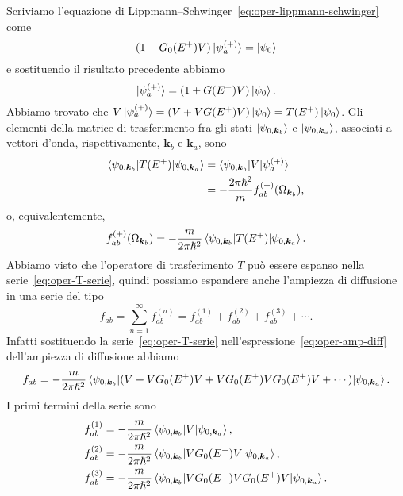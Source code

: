 \documentclass[a4paper,fleqn,twoside,12pt]{article}
\begin{document}
Scriviamo l'equazione di Lippmann–Schwinger~\eqref{eq:oper-lippmann-schwinger}
come
\begin{equation}
  (1 - G_{0}(E^{+})V)\ket{\psi_{a}^{(+)}} = \ket{\psi_{0}}
\end{equation}
e sostituendo il risultato precedente abbiamo
\begin{equation}
  \ket{\psi_{a}^{(+)}} = (1 + G(E^{+})V)\ket{\psi_{0}}.
\end{equation}
Abbiamo trovato che
$V\ket{\psi_{a}^{(+)}} = (V + VG(E^{+})V)\ket{\psi_{0}} =
T(E^{+})\ket{\psi_{0}}$. Gli elementi della matrice di trasferimento fra gli
stati $\ket{\psi_{0,\bm{k}_{b}}}$ e $\ket{\psi_{0,\bm{k}_{a}}}$, associati a
vettori d'onda, rispettivamente, $\bm{k}_{b}$ e $\bm{k}_{a}$, sono
\begin{equation}
  \label{eq:oper-T-amp}
  \begin{split}
    \braket{\psi_{0,\bm{k}_{b}} | T(E^{+}) | \psi_{0,\bm{k}_{a}}} &=
    \braket{\psi_{0,\bm{k}_{b}} | V | \psi_{a}^{(+)}} \\
    &= -\frac{2\pi\hslash^{2}}{m} f_{ab}^{(+)}(\Omega_{\bm{k}_{b}}),
  \end{split}
\end{equation}
o, equivalentemente,
\begin{equation}
  \label{eq:oper-amp-diff}
  f_{ab}^{(+)}(\Omega_{\bm{k}_{b}}) = -\frac{m}{2\pi\hslash^{2}}
  \braket{\psi_{0,\bm{k}_{b}} | T(E^{+}) | \psi_{0,\bm{k}_{a}}}.
\end{equation}
Abbiamo visto che l'operatore di trasferimento $T$ può essere espanso nella
serie~\eqref{eq:oper-T-serie}, quindi possiamo espandere anche l'ampiezza di
diffusione in una serie del tipo
\begin{equation}
  f_{ab} = \sum_{n = 1}^{\infty} f_{ab}^{(n)} = f_{ab}^{(1)} + f_{ab}^{(2)} +
  f_{ab}^{(3)} + \cdots.
\end{equation}
Infatti sostituendo la serie~\eqref{eq:oper-T-serie}
nell'espressione~\eqref{eq:oper-amp-diff} dell'ampiezza di diffusione abbiamo
\begin{equation}
  f_{ab} = -\frac{m}{2\pi\hslash^{2}} \braket{\psi_{0,\bm{k}_{b}} | (V +
    VG_{0}(E^{+})V + VG_{0}(E^{+})VG_{0}(E^{+})V + \cdots) |
    \psi_{0,\bm{k}_{a}}}.
\end{equation}
I primi termini della serie sono
\begin{subequations}
  \begin{align}
    f_{ab}^{(1)} &= -\frac{m}{2\pi\hslash^{2}}
    \braket{\psi_{0,\bm{k}_{b}} | V | \psi_{0,\bm{k}_{a}}}, \\
    f_{ab}^{(2)} &= -\frac{m}{2\pi\hslash^{2}} \braket{\psi_{0,\bm{k}_{b}} |
      VG_{0}(E^{+})V | \psi_{0,\bm{k}_{a}}}, \\
    f_{ab}^{(3)} &= -\frac{m}{2\pi\hslash^{2}} \braket{\psi_{0,\bm{k}_{b}} |
      VG_{0}(E^{+})VG_{0}(E^{+})V | \psi_{0,\bm{k}_{a}}}.
  \end{align}
\end{subequations}
\end{document}
